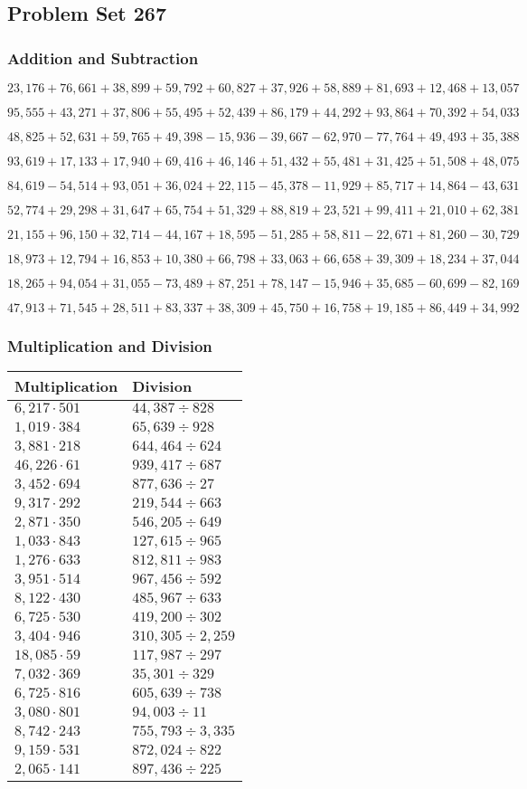 \hypertarget{problem-set-267}{%
\subsection{Problem Set 267}\label{problem-set-267}}

\hypertarget{addition-and-subtraction}{%
\subsubsection{Addition and
Subtraction}\label{addition-and-subtraction}}

\(23,176+76,661+38,899+59,792+60,827+37,926+58,889+81,693+12,468+13,057\)

\(95,555+43,271+37,806+55,495+52,439+86,179+44,292+93,864+70,392+54,033\)

\(48,825+52,631+59,765+49,398-15,936-39,667-62,970-77,764+49,493+35,388\)

\(93,619+17,133+17,940+69,416+46,146+51,432+55,481+31,425+51,508+48,075\)

\(84,619-54,514+93,051+36,024+22,115-45,378-11,929+85,717+14,864-43,631\)

\(52,774+29,298+31,647+65,754+51,329+88,819+23,521+99,411+21,010+62,381\)

\(21,155+96,150+32,714-44,167+18,595-51,285+58,811-22,671+81,260-30,729\)

\(18,973+12,794+16,853+10,380+66,798+33,063+66,658+39,309+18,234+37,044\)

\(18,265+94,054+31,055-73,489+87,251+78,147-15,946+35,685-60,699-82,169\)

\(47,913+71,545+28,511+83,337+38,309+45,750+16,758+19,185+86,449+34,992\)

\hypertarget{multiplication-and-division}{%
\subsubsection{Multiplication and
Division}\label{multiplication-and-division}}

\begin{longtable}[]{@{}ll@{}}
\toprule
Multiplication & Division\tabularnewline
\midrule
\endhead
\(6,217\cdot501\) & \(44,387÷828\)\tabularnewline
\(1,019\cdot384\) & \(65,639÷928\)\tabularnewline
\(3,881\cdot218\) & \(644,464÷624\)\tabularnewline
\(46,226\cdot61\) & \(939,417÷687\)\tabularnewline
\(3,452\cdot694\) & \(877,636÷27\)\tabularnewline
\(9,317\cdot292\) & \(219,544÷663\)\tabularnewline
\(2,871\cdot350\) & \(546,205÷649\)\tabularnewline
\(1,033\cdot843\) & \(127,615÷965\)\tabularnewline
\(1,276\cdot633\) & \(812,811÷983\)\tabularnewline
\(3,951\cdot514\) & \(967,456÷592\)\tabularnewline
\(8,122\cdot430\) & \(485,967÷633\)\tabularnewline
\(6,725\cdot530\) & \(419,200÷302\)\tabularnewline
\(3,404\cdot946\) & \(310,305÷2,259\)\tabularnewline
\(18,085\cdot59\) & \(117,987÷297\)\tabularnewline
\(7,032\cdot369\) & \(35,301÷329\)\tabularnewline
\(6,725\cdot816\) & \(605,639÷738\)\tabularnewline
\(3,080\cdot801\) & \(94,003÷11\)\tabularnewline
\(8,742\cdot243\) & \(755,793÷3,335\)\tabularnewline
\(9,159\cdot531\) & \(872,024÷822\)\tabularnewline
\(2,065\cdot141\) & \(897,436÷225\)\tabularnewline
\bottomrule
\end{longtable}
